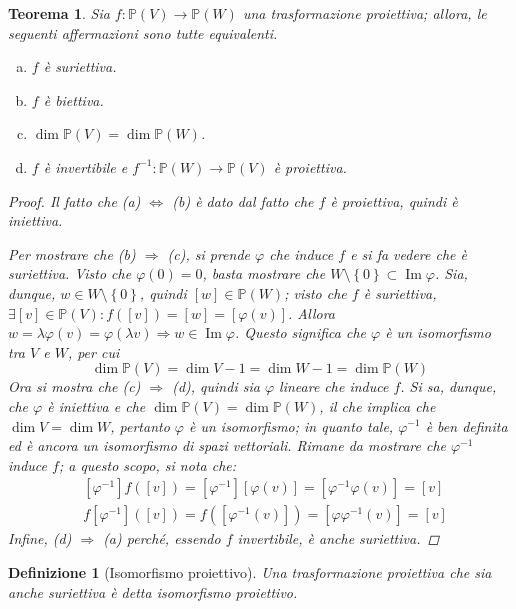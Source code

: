 \documentclass[12pt]{scrartcl}
\theoremstyle{style}
\newtheorem{definizione}{Definizione}[section]
\newtheorem{teorema}{Teorema}[section]
\numberwithin{equation}{subsection}
\begin{document}
\begin{teorema}
	Sia $f:\mathbb{P}(V)\to \mathbb{P}(W)$ una trasformazione proiettiva; allora, le seguenti affermazioni sono tutte equivalenti.
	\begin{enumerate}[(a).]
		\item $f$ \`e suriettiva.
		\item $f$ \`e biettiva.
		\item $\dim \mathbb{P}(V) = \dim\mathbb{P}(W)$.
		\item $f$ \`e invertibile e $f^{-1} : \mathbb{P}(W) \to \mathbb{P}(V)$ \`e proiettiva.
	\end{enumerate}
	\begin{proof}
		Il fatto che (a) $\iff$ (b) \`e dato dal fatto che $f$ \`e proiettiva, quindi \`e iniettiva.

Per mostrare che (b) $\Rightarrow $ (c), si prende $\varphi $ che induce $f$ e si fa vedere che \`e suriettiva.
Visto che $\varphi (0) = 0$, basta mostrare che $W\setminus \left\{ 0 \right\} \subset \operatorname{Im} \varphi $.
Sia, dunque, $w \in W \setminus \left\{ 0 \right\} $, quindi $[w] \in \mathbb{P}(W)$; visto che $f$ \`e suriettiva, $\exists [v] \in \mathbb{P}(V) : f([v]) = [w] = [\varphi (v)]$. 
Allora $w = \lambda \varphi (v) = \varphi (\lambda v) \Rightarrow w \in \operatorname{Im} \varphi $.
Questo significa che $\varphi $ \`e un isomorfismo tra $V$ e $W$, per cui
\[
\dim \mathbb{P}(V) = \dim V - 1 = \dim W -1 = \dim \mathbb{P}(W)
\] 
Ora si mostra che (c) $\Rightarrow $ (d), quindi sia $\varphi $ lineare che induce $f$. 
Si sa, dunque, che $\varphi $ \`e iniettiva e che $\dim \mathbb{P}(V) = \dim \mathbb{P}(W)$, il che implica che $\dim V = \dim W$, pertanto $\varphi $ \`e un isomorfismo; in quanto tale, $\varphi ^{-1} $ \`e ben definita ed \`e ancora un isomorfismo di spazi vettoriali.
Rimane da mostrare che $\varphi ^{-1} $ induce $f$; a questo scopo, si nota che:
\[
\begin{split}
	&[\varphi ^{-1} ] f([v]) = [\varphi ^{-1} ][\varphi (v)] = [\varphi ^{-1} \varphi (v)] = [v]\\
	&f[\varphi ^{-1} ]([v]) = f \left([\varphi ^{-1} (v)]\right) =[\varphi \varphi ^{-1} (v)] = [v]
\end{split}
\] 
Infine, (d) $\Rightarrow $ (a) perch\'e, essendo $f$ invertibile, \`e anche suriettiva.
	\end{proof}
\end{teorema}
\begin{definizione}
	[Isomorfismo proiettivo]
	Una trasformazione proiettiva che sia anche suriettiva \`e detta \textit{isomorfismo proiettivo}.
\end{definizione}
\end{document}
